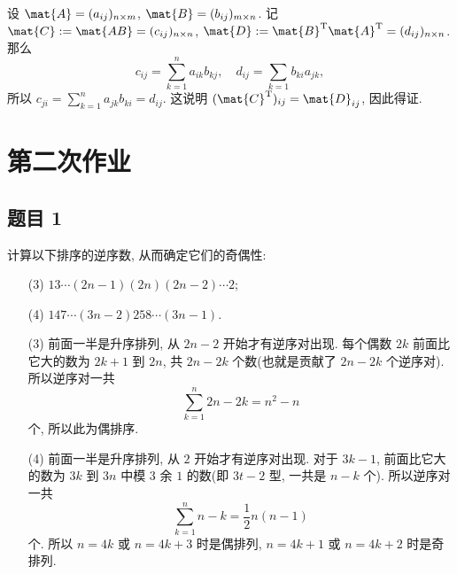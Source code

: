 \begin{solution}
设 $\mat{A} = (a_{ij})_{n \times m}$, $\mat{B} = (b_{ij})_{m \times n}$. 记 $\mat{C} := \mat{AB} = (c_{ij})_{n \times n}$, $\mat{D} := \mat{B}^{\mathrm{T}} \mat{A}^{\mathrm{T}} = (d_{ij})_{n \times n}$. 那么
\[
c_{ij} = \sum_{k = 1}^{n} a_{ik} b_{kj}, \quad d_{ij} = \sum_{k = 1} b_{ki} a_{jk},
\]
所以 $c_{ji} = \sum_{k = 1}^{n} a_{jk} b_{ki} = d_{ij}$. 这说明 $(\mat{C}^{\mathrm{T}})_{ij} = \mat{D}_{ij}$, 因此得证.
\end{solution}

\newpage
\section{第二次作业}
\subsection*{题目 1}
\begin{problem*}
    计算以下排序的逆序数, 从而确定它们的奇偶性:
\begin{enumerate}
    \item[(3)] $1 3 \cdots (2n - 1)(2n)(2n - 2) \cdots 2$;
    \item[(4)] $147 \cdots (3n - 2)258 \cdots (3n - 1)$.
\end{enumerate}
\end{problem*}
\begin{solution}
\begin{enumerate}
    \item[(3)] 前面一半是升序排列, 从 $2n - 2$ 开始才有逆序对出现. 每个偶数 $2k$ 前面比它大的数为 $2k + 1$ 到 $2n$, 共 $2n - 2k$ 个数(也就是贡献了 $2n - 2k$ 个逆序对). 所以逆序对一共
    \[
    \sum_{k = 1}^{n} 2n - 2k = n^2 - n
    \]
    个, 所以此为偶排序.
    \item[(4)] 前面一半是升序排列, 从 $2$ 开始才有逆序对出现. 对于 $3k - 1$, 前面比它大的数为 $3k$ 到 $3n$ 中模 $3$ 余 $1$ 的数(即 $3t - 2$ 型, 一共是 $n - k$ 个). 所以逆序对一共
    \[
    \sum_{k = 1}^{n} n - k = \frac{1}{2}n(n - 1)
    \]
    个. 所以 $n = 4k$ 或 $n = 4k + 3$ 时是偶排列, $n = 4k + 1$ 或 $n = 4k + 2$ 时是奇排列.
\end{enumerate}
\end{solution}

